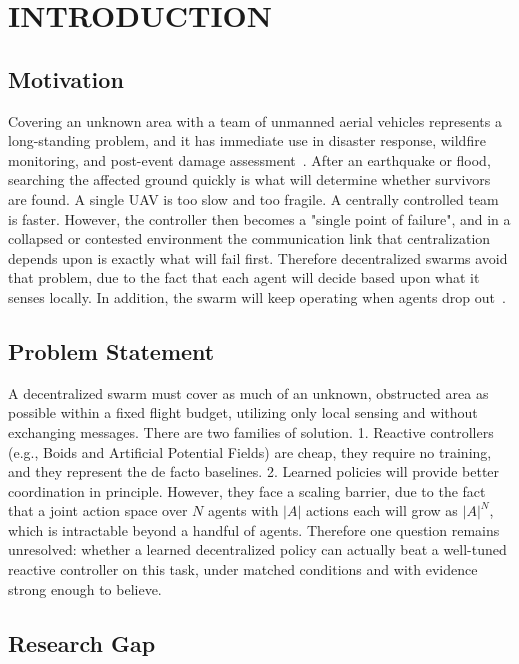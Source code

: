 \documentclass[a4paper, 10pt, conference]{ieeeconf}
\begin{document}
\section{INTRODUCTION}\label{sec:intro}

\subsection{Motivation}

Covering an unknown area with a team of unmanned aerial vehicles
represents a long-standing problem, and it has immediate use in
disaster response, wildfire monitoring, and post-event damage
assessment~\cite{erdelj2017}. After an earthquake or flood, searching
the affected ground quickly is what will determine whether survivors
are found. A single UAV is too slow and too fragile. A centrally
controlled team is faster. However, the controller then becomes a
"single point of failure", and in a collapsed or contested environment
the communication link that centralization depends upon is exactly
what will fail first. Therefore decentralized swarms avoid that
problem, due to the fact that each agent will decide based upon what
it senses locally. In addition, the swarm will keep operating when
agents drop out~\cite{dorigo2021}.

\subsection{Problem Statement}

A decentralized swarm must cover as much of an unknown, obstructed
area as possible within a fixed flight budget, utilizing only local
sensing and without exchanging messages. There are two families of
solution. 1. Reactive controllers (e.g., Boids and Artificial
Potential Fields) are cheap, they require no training, and they
represent the de facto baselines. 2. Learned policies will provide
better coordination in principle. However, they face a scaling
barrier, due to the fact that a joint action space over $N$ agents
with $|A|$ actions each will grow as $|A|^N$, which is intractable
beyond a handful of agents. Therefore one question remains unresolved:
whether a learned decentralized policy can actually beat a well-tuned
reactive controller on this task, under matched conditions and with
evidence strong enough to believe.

\subsection{Research Gap}
\end{document}
